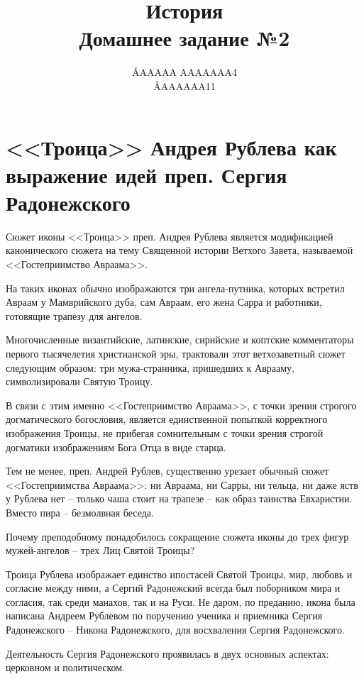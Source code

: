 \documentclass[12pt]{article}
\title{История \\ Домашнее задание №2}
\author{\AA{AAAAA AAAAAAA}{4} \\ \AA{AAAAAA}{11}}
\begin{document}
  \maketitle

  \setcounter{section}{2}
  \section{<<Троица>> Андрея Рублева как выражение идей преп. Сергия Радонежского}
  Сюжет иконы <<Троица>> преп. Андрея Рублева является модификацией канонического сюжета на тему Священной истории Ветхого Завета,
  называемой <<Гостеприимство Авраама>>.

  На таких иконах обычно изображаются три ангела-путника,
  которых встретил Авраам у Мамврийского дуба, сам Авраам, его жена Сарра
  и работники, готовящие трапезу для ангелов.

  Многочисленные византийские, латинские, сирийские и коптские комментаторы первого тысячелетия христианской эры,
  трактовали этот ветхозаветный сюжет следующим образом:
  три мужа-странника, пришедших к Аврааму, символизировали Святую Троицу.

  В связи с этим именно <<Гостеприимство Авраама>>, с точки зрения строгого догматического богословия,
  является единственной попыткой корректного изображения Троицы,
  не прибегая сомнительным с точки зрения строгой догматики изображениям Бога Отца в виде старца.

  Тем не менее, преп. Андрей Рублев, существенно урезает обычный сюжет <<Гостеприимства Авраама>>:
  ни Авраама, ни Сарры, ни тельца, ни даже яств у Рублева нет -- только чаша стоит на трапезе -- как образ таинства Евхаристии.
  Вместо пира -- безмолвная беседа.

  Почему преподобному понадобилось сокращение сюжета иконы до трех фигур мужей-ангелов -- трех Лиц Святой Троицы?

  Троица Рублева изображает единство ипостасей Святой Троицы, мир, любовь и согласие между ними,
  а Сергий Радонежский всегда был поборником мира и согласия, так среди манахов, так и на Руси.
  Не даром, по преданию, икона была написана Андреем Рублевом по поручению ученика и приемника Сергия Радонежского -- Никона Радонежского,
  для восхваления Сергия Радонежского.

  Деятельность Сергия Радонежского проявилась в двух основных аспектах: церковном и политическом.
\end{document}
